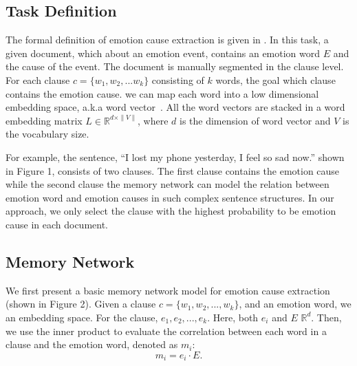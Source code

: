\documentclass[11pt,letterpaper]{article}
\begin{document}
\begin{CJK*}{UTF8}{gbsn}
\subsection{Task Definition}
\label{sec:definition}

The formal definition of emotion cause extraction is given in \cite{gui2016event}. In this task, a given document, which 
about an emotion event, contains an emotion word $E$ and the cause of the event. The document is manually segmented in the clause level. For each clause $c = \{w_{1}, w_{2},...w_{k}\}$ consisting of $k$ words, the goal 
which clause contains the emotion cause. 
we can map each word into a low dimensional embedding space, a.k.a word vector~\cite{mikolov2013distributed}. All the word vectors are stacked in a word embedding matrix $L \in \mathbb{R}^{d\times \|V\| }$, where $d$ is the dimension of word vector and $V$ is the vocabulary size.

For example, the sentence, ``I lost my phone yesterday, I feel so sad now.'' shown in Figure 1, consists of two clauses. The first clause contains the emotion cause while the second clause 
the memory network can  model the relation between 
emotion word and  emotion causes in such complex sentence structures. In our approach, we only select the clause with the highest probability to be  emotion cause in each document.

\subsection{Memory Network}
\label{sec:basicMemoryNetwork}

We first present a basic memory network model for emotion cause extraction (shown in Figure 2). Given a clause $c=\{w_1,w_2,...,w_k\}$, and an emotion word, we 
an embedding space. For the clause, 
$e_1,e_2,...,e_k$.
Here, both $e_i$ and $E$  $\mathbb{R}^d$. Then, we use the inner product to evaluate the correlation between each word in a clause and the emotion word, denoted as $m_i$:
\begin{equation}
m_i = e_i \cdot E.
\end{equation}


\end{CJK*}
\end{document}
